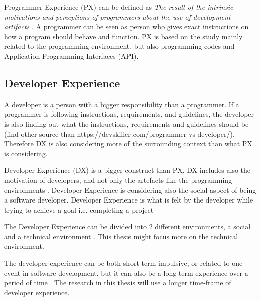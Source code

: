 \documentclass[english, 12pt, a4paper, sci, utf8, a-1b, online]{aaltothesis}
\begin{document}
Programmer Experience (PX) can be defined as \textit{The result of the intrinsic motivations and perceptions of programmers about the use of development artifacts} \citep{programmer-experience}. A programmer can be seen as person who gives exact instructions on how a program should behave and function. PX is based on the study mainly related to the programming environment, but also programming codes and Application Programming Interfaces (API).

\subsection{Developer Experience}

A developer is a person with a bigger responsibility than a programmer. If a programmer is following instructions, requirements, and guidelines, the developer is also finding out what the instructions, requirements and guidelines should be {\color{gray} (find other source than https://devskiller.com/programmer-vs-developer/).} Therefore DX is also considering more of the surrounding context than what PX is considering.

Developer Experience (DX) is a bigger construct than PX. DX includes also the motivation of developers, and not only the artefacts like the programming environments \citep{programmer-experience}. Developer Experience is considering also the social aspect of being a software developer. Developer Experience is what is felt by the developer while trying to achieve a goal i.e. completing a project

The Developer Experience can be divided into 2 different environments, a social and a technical environment \citep{fagerholm-doctoral-thesis}. This thesis might focus more on the technical environment.

The developer experience can be both short term impulsive, or related to one event in software development, but it can also be a long term experience over a period of time \citep{fagerholm-doctoral-thesis}. The research in this thesis will use a longer time-frame of developer experience.
\end{document}
